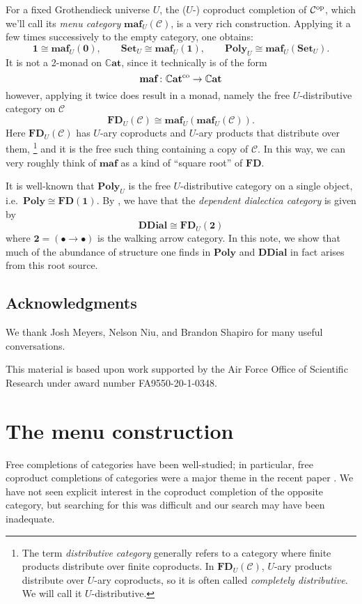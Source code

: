 \documentclass[11pt, one side, article]{memoir}
\theoremstyle{definition}
\theoremstyle{plain}
\newcommand{\cat}[1]{\mathcal{#1}}%
\newcommand{\Cat}[1]{\mathbf{#1}}%
\newcommand{\op}{^\tn{op}}
\newcommand{\co}{^\tn{co}}
\newcommand{\tn}[1]{\textnormal{#1}}
\newcommand{\smset}{\Cat{Set}}
\newcommand{\smcat}{\mathbb{C}\Cat{at}}
\newcommand{\poly}{\Cat{Poly}}
\newcommand{\0}{\Cat{0}}
\newcommand{\1}{\Cat{1}}
\newcommand{\fd}{\Cat{FD}}
\newcommand{\opfam}{\Cat{maf}}
\newcommand{\ddial}{\Cat{DDial}}
\begin{document}
For a fixed Grothendieck universe $U$, the ($U$-) coproduct completion of $\cat{C}\op$, which we'll call its \emph{menu category} $\opfam_U(\cat{C})$, is a very rich construction. Applying it a few times successively to the empty category, one obtains:
\[
	\1\cong \opfam_U(\0),\qquad
	\smset_U\cong\opfam_U(\1),\qquad
	\poly_U\cong\opfam_U(\smset_U).
\]
It is not a 2-monad on $\smcat$, since it technically is of the form
\[
\opfam\colon\smcat\co\to\smcat
\]
however, applying it twice does result in a monad, namely the free $U$-distributive category on $\cat{C}$
\[
\fd_U(\cat{C})\cong\opfam_U(\opfam_U(\cat{C})).
\]
Here $\fd_U(\cat{C})$ has $U$-ary coproducts and $U$-ary products that distribute over them,%
\footnote{The term \emph{distributive category} generally refers to a category where finite products distribute over finite coproducts. In $\fd_U(\cat{C})$, $U$-ary products distribute over $U$-ary coproducts, so it is often called \emph{completely distributive}. We will call it $U$-distributive.}
 and it is the free such thing containing a copy of $\cat{C}$. In this way, we can very roughly think of $\opfam$ as a kind of ``square root'' of $\fd$. 

It is well-known that $\poly_U$ is the free $U$-distributive category on a single object, i.e.\ $\poly\cong\fd(\1)$. By \cite{moss2018dialectica}, we have that the \emph{dependent dialectica category} is given by 
\[\ddial\cong\fd_U(\Cat{2})\]
where $\Cat{2}=(\bullet\to\bullet)$ is the walking arrow category. In this note, we show that much of the abundance of structure one finds in $\poly$ and $\ddial$ in fact arises from this root source.

\section*{Acknowledgments}
We thank Josh Meyers, Nelson Niu, and Brandon Shapiro for many useful conversations.  

This material is based upon work supported by the Air Force Office of Scientific Research under award number FA9550-20-1-0348.


\chapter{The menu construction}

Free completions of categories have been well-studied; in particular, free coproduct completions of categories were a major theme in the recent paper \cite{adamek2020nice}. We have not seen explicit interest in the coproduct completion of the opposite category, but searching for this was difficult and our search may have been inadequate.
\end{document}

